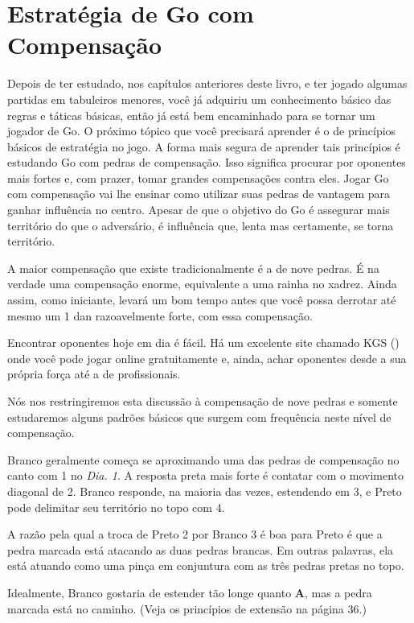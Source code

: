 \chapter{Estratégia de Go com Compensação}

Depois de ter estudado, nos capítulos anteriores deste livro, e ter jogado algumas partidas em tabuleiros menores, você já adquiriu um conhecimento básico das regras e táticas básicas, então já está bem encaminhado para se tornar um jogador de Go. O próximo tópico que você precisará aprender é o de princípios básicos de estratégia no jogo. A forma mais segura de aprender tais princípios é estudando Go com pedras de compensação. Isso significa procurar por oponentes mais fortes e, com prazer, tomar grandes compensações contra eles. Jogar Go com compensação vai lhe ensinar como utilizar suas pedras de vantagem para ganhar influência no centro. Apesar de que o objetivo do Go é assegurar mais território do que o adversário, é influência que, lenta mas certamente, se torna território.

A maior compensação que existe tradicionalmente é a de nove pedras. É na verdade uma compensação enorme, equivalente a uma rainha no xadrez. Ainda assim, como iniciante, levará um bom tempo antes que você possa derrotar até mesmo um 1 dan razoavelmente forte, com essa compensação.

Encontrar oponentes hoje em dia é fácil. Há um excelente site chamado KGS (\href{https://www.gokgs.com}{})~\cite{kgs} onde você pode jogar online gratuitamente e, ainda, achar oponentes desde a sua própria força até a de profissionais.

Nós nos restringiremos esta discussão à compensação de nove pedras e somente estudaremos alguns padrões básicos que surgem com frequência neste nível de compensação.

\bigskip

Branco geralmente começa se aproximando uma das pedras de compensação no canto com 1 no \emph{Dia. 1}. A resposta preta mais forte é contatar com o movimento diagonal de 2. Branco responde, na maioria das vezes, estendendo em 3, e Preto pode delimitar seu território no topo com 4.

A razão pela qual a troca de Preto 2 por Branco 3 é boa para Preto é que a pedra marcada está atacando as duas pedras brancas. Em outras palavras, ela está atuando como uma pinça em conjuntura com as três pedras pretas no topo.

Idealmente, Branco gostaria de estender tão longe quanto \textbf{A}, mas a pedra marcada está no caminho. (Veja os princípios de extensão na página 36.)

